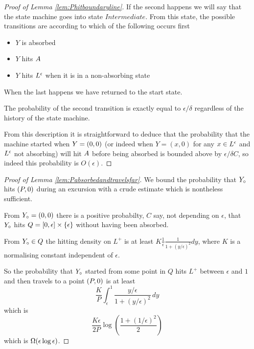 {\begin{proof}[Proof of Lemma \ref{lem:Phitboundaryline}]
\newcommand{\stateintermediate}{Intermediate}

If the second happens we will say that the state machine goes into
state $\stateintermediate$.  From this state, the possible transitions
are according to which of the following occurs first

\begin{itemize}
\item $Y$ is absorbed
\item $Y$ hits $A$
\item $Y$ hits $L^\epsilon$ when it is in a non-absorbing state
\end{itemize}

When the last happens we have returned to the start state.

The probability of the second transition is exactly equal to
$\epsilon/\delta$ regardless of the history of the state machine.

From this description it is straightforward to deduce that the
probability that the machine started when $Y = (0,0)$ (or indeed when
$Y = (x, 0)$ for any $x \in L^\epsilon$ and $L^\epsilon$ not absorbing) will hit
$A$ before being absorbed is
bounded above by $\epsilon/\delta C$, so indeed this probability is
$O(\epsilon)$.
\end{proof}

\begin{proof}[Proof of Lemma \ref{lem:Pabsorbedandtravelsfar}]
We bound the probability that $Y_\circ$ hits $(P,0)$ during an
excursion with a crude estimate which is nontheless sufficient.

From $Y_\circ = (0,0)$ there is a positive probabilty, $C$ say, not
depending on $\epsilon$, that $Y_\circ$ hits $Q = [0, \epsilon] \times
\{\epsilon\}$ without having been absorbed.

From $Y_\circ \in Q$ the hitting density on $L^+$ is at least $K
\frac{1}{\epsilon} \frac{1}{1 + (y/\epsilon)^2} dy$, where $K$ is a
normalising constant independent of $\epsilon$.

So the probability that $Y_\circ$ started from some point in $Q$ hits $L^+$
between $\epsilon$ and $1$ and then travels to a point $(P,0)$ is at least
\[
\frac{K}{P} \int_{\epsilon}^{1} \frac{y/\epsilon}{1 + (y/\epsilon)^2}
\, dy
\]
which is
\[
\frac{K\epsilon}{2P} \log\left(\frac{1 + (1/\epsilon)^2}{2}\right)
\]
which is $\Omega(\epsilon\log\epsilon)$.
\end{proof}
}
